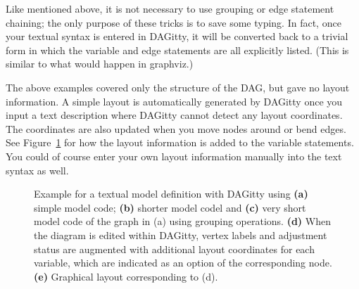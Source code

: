 \documentclass[a4paper]{article} %
\newcommand{\pp}{DAGitty\xspace}
\begin{document}
Like mentioned above, it is not necessary to use grouping or edge statement chaining; the only purpose of these tricks is to save some typing. In fact, once your textual syntax is entered in \pp, it will be converted back to a trivial form in which the variable and edge statements are all explicitly listed. (This is similar to what would happen in graphviz.)

The above examples covered only the structure of the DAG, but gave no layout information. A simple layout is automatically generated by \pp once you input a text description where \pp cannot detect any layout coordinates. The coordinates are also updated when you move nodes around or bend edges. See Figure~\ref{fig:syntax} for how the layout information is added to the variable statements. You could of course enter your own layout information manually into the text syntax as well.
\begin{figure}
\caption{
Example for a textual model definition with \pp using {\bfseries (a)} simple model code; 
{\bfseries (b)} shorter model codel
and {\bfseries (c)} very short model code of the graph in (a) using 
 grouping operations. {\bfseries (d)} When the diagram is edited within \pp, vertex labels 
and adjustment status are augmented with additional layout coordinates
for each variable, which are indicated as an option of the corresponding node.
{\bfseries (e)} Graphical layout corresponding to (d).
}
\label{fig:syntax}
\end{figure}
\end{document}
